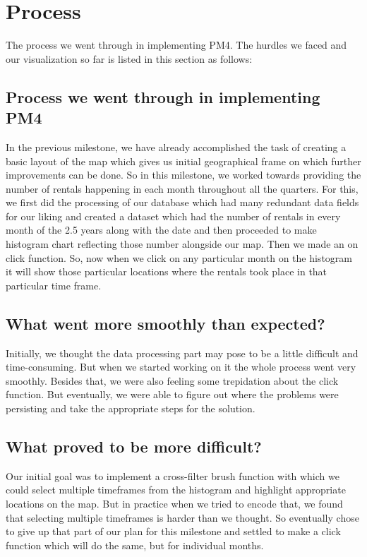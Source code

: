 \section{Process} 
\label{sec:process}

The process we went through in implementing PM4. The hurdles we faced and our visualization so far is listed in this section as follows: 

\subsection{Process we went through in implementing PM4}
In the previous milestone, we have already accomplished the task of creating a basic layout of the map which gives us initial geographical frame on which further improvements can be done. So in this milestone, we worked towards providing the number of rentals happening in each month throughout all the quarters. For this, we first did the processing of our database which had many redundant data fields for our liking and created a dataset which had the number of rentals in every month of the 2.5 years along with the date and then proceeded to make histogram chart reflecting those number alongside our map. Then we made an on click function. So, now when we click on any particular month on the histogram it will show those particular locations where the rentals took place in that particular time frame. 

\subsection{What went more smoothly than expected?}
Initially, we thought the data processing part may pose to be a little difficult and time-consuming. But when we started working on it the whole process went very smoothly. Besides that, we were also feeling some trepidation about the click function. But eventually, we were able to figure out where the problems were persisting and take the appropriate steps for the solution.

\subsection{What proved to be more difficult?}
Our initial goal was to implement a cross-filter brush function with which we could select multiple timeframes from the histogram and highlight appropriate locations on the map. But in practice when we tried to encode that, we found that selecting multiple timeframes is harder than we thought. So eventually chose to give up that part of our plan for this milestone and settled to make a click function which will do the same, but for individual months. 

